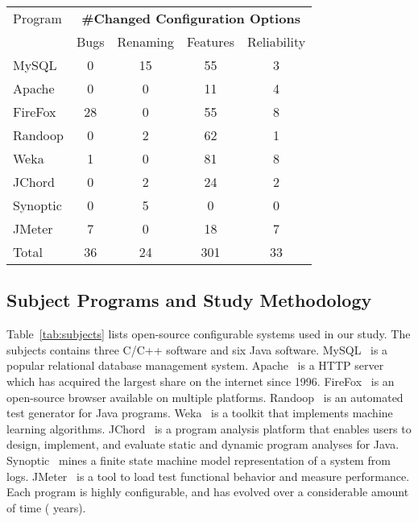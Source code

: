 \begin{table}[t]
\vspace{1mm}
\centering
\small{
\setlength{\tabcolsep}{.50\tabcolsep}
\begin{tabular}{|l|c|c|c|c|}
\hline
 Program & \multicolumn{4}{|c|}{\textbf{\#Changed Configuration Options}} \\
 \cline{2-5}
 & Bugs & Renaming & Features & Reliability \\
 \hline
 \hline
 MySQL & 0 & 15 & 55 & 3 \\
 Apache& 0 & 0 & 11 & 4 \\
 FireFox& 28 & 0 & 55 & 8 \\
 Randoop & 0  & 2 & 62  & 1\\
 Weka & 1  & 0 & 81  & 8 \\
 JChord & 0  & 2 & 24 & 2\\ %
 Synoptic & 0 &  5 & 0 & 0\\
 JMeter & 7  & 0 & 18 & 7 \\
\hline
\hline
 Total & 36 & 24 & 301 & 33 \\
\hline
\end{tabular}
}
\vspace{-2mm}
\end{table}


\subsection{Subject Programs and Study Methodology}


Table~\ref{tab:subjects} lists
\studysubjnum open-source configurable systems used in our
study. The \studysubjnum subjects contains
three C/C++ software and six Java software.
MySQL~\cite{}  is a popular relational database management
system. Apache~\cite{} is a HTTP server which has acquired
the largest share on the internet since 1996. FireFox~\cite{}
is an open-source browser available on multiple platforms.
Randoop~\cite{} is an automated test generator for Java
programs. Weka~\cite{} is a toolkit that implements machine
learning algorithms. JChord~\cite{} is a program analysis platform that
enables users to design, implement, and evaluate static and
dynamic program analyses for Java. Synoptic~\cite{} mines a
finite state machine model representation of a system from
logs. JMeter~\cite{} is a tool to load test functional
behavior and measure performance.
Each program is highly configurable, and has evolved over
a considerable amount of time ( years).


